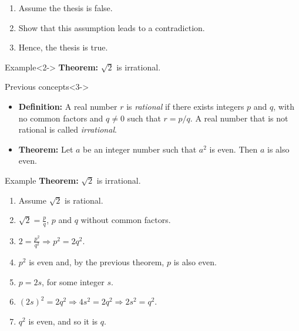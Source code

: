 \documentclass[11pt,a4paper,xcolor=dvipsnames, leqno]{beamer}
\begin{document}
\begin{frame}
\begin{enumerate}
\item Assume the thesis is false.
\item Show that this assumption leads to a contradiction.
\item Hence, the thesis is true.
\end{enumerate}
\begin{alertblock}{Example}<2->
\textbf{Theorem:} $\sqrt{2}$ is irrational.
\end{alertblock}

\begin{block}{Previous concepts}<3->
\begin{itemize}
\item \textbf{Definition:} A real number $r$ is \emph{rational} if there exists integers $p$ and $q$, with no common factors and $q\neq 0$ such that $r = p/q$. A real number that is not rational is called \emph{irrational}.
\item \textbf{Theorem:} Let $a$ be an integer number such that $a^2$ is even. Then $a$ is also even.
\end{itemize}
\end{block}
\end{frame}

\begin{frame}
\begin{alertblock}{Example}
\textbf{Theorem:} $\sqrt{2}$ is irrational.
\begin{enumerate}
\item<2-> Assume $\sqrt{2}$ is rational.
\item<3-> $\sqrt{2} = \frac{p}{q}$, $p$ and $q$ without common factors.
\item<4-> $2 = \frac{p^2}{q^2}\Rightarrow p^2 = 2q^2.$
\item<5-> $p^2$ is even and, by the previous theorem, $p$ is also even.
\item<6-> $p = 2s$, for some integer $s$.
\item <7->$(2s)^2 = 2q^2 \Rightarrow 4s^2 = 2q^2 \Rightarrow 2s^2 = q^2$.
\item<8-> $q^2$ is even, and so it is $q$.
\end{enumerate}
\end{alertblock}
\end{frame}
\end{document}
